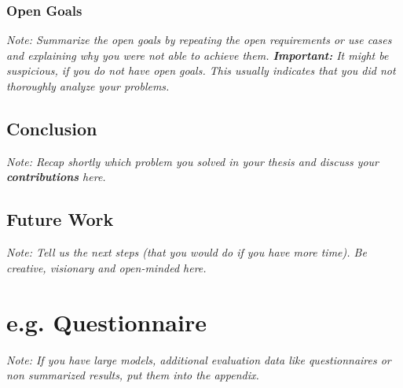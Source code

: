 \subsection{Open Goals}

\textit{Note: Summarize the open goals by repeating the open requirements or use cases and explaining why you were not able to achieve them. \textbf{Important:} It might be suspicious, if you do not have open goals. This usually indicates that you did not thoroughly analyze your problems.}

\section{Conclusion}

\textit{Note: Recap shortly which problem you solved in your thesis and discuss your \textbf{contributions} here.}

\section{Future Work}

\textit{Note: Tell us the next steps  (that you would do if you have more time). Be creative, visionary and open-minded here.}



\appendix

\chapter{e.g. Questionnaire}

\textit{Note: If you have large models, additional evaluation data like questionnaires or non summarized results, put them into the appendix.}


\clearpage

\listoffigures
\clearpage

\listoftables
\clearpage





